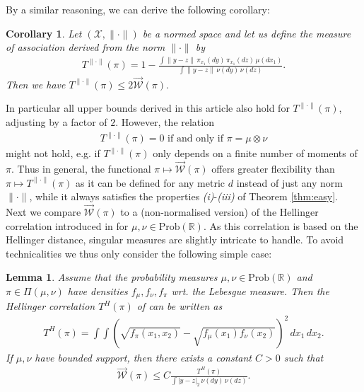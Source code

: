 \documentclass[10pt]{amsart}
\newtheorem{lemma}[theorem]{Lemma}
\newtheorem{corollary}[theorem]{Corollary}
\newcommand{\R}{\mathbb{R}}
\begin{document}
By a similar reasoning, we can derive the following corollary:
\begin{corollary}
Let $(\mathcal{X},\|\cdot\|)$ be a normed space and let us define the measure of association derived from the norm $\|\cdot\|$ by 
\begin{align*}
T^{\|\cdot\|}(\pi)= 1-\frac{\int \|y-z\| \,\pi_{x_1}(dy)\,\pi_{x_1}(dz)\,\mu(dx_1)}{\int \|y-z\| \,\nu(dy)\,\nu(dz)}.
\end{align*}
Then we have $T^{\|\cdot\|}(\pi)\le 2 \overrightarrow{\mathcal{W}}(\pi).$ 
\end{corollary}

In particular all upper bounds derived in this article also hold for $T^{\|\cdot\|}(\pi)$, adjusting by a factor of $2$. However, the relation 
\begin{align*}
T^{\|\cdot\|}(\pi)=0 \text{ if and only if } \pi=\mu\otimes\nu
\end{align*}
might not hold, e.g. if $T^{\|\cdot\|}(\pi)$ only depends on a finite number of moments of $\pi$. Thus in general, the functional $\pi\mapsto \overrightarrow{\mathcal{W}}(\pi)$ offers greater flexibility than $\pi\mapsto T^{\|\cdot\|}(\pi)$ as it can be defined for any metric $d$ instead of just any norm $\|\cdot\|$, while it always satisfies the properties \textit{(i)}-\textit{(iii)} of Theorem \ref{thm:easy}.\\

Next we compare $\overrightarrow{\mathcal{W}}(\pi)$ to a (non-normalised version) of the Hellinger correlation introduced in \cite{geenens2020hellinger} for $\mu,\nu\in \mathrm{Prob}(\R)$. As this correlation is based on the Hellinger distance, singular measures are slightly intricate to handle. To avoid technicalities we thus only consider the following simple case:

\begin{lemma}\label{lem:hell}
Assume that the probability measures $\mu,\nu\in \text{Prob}(\R)$ and $\pi\in \Pi(\mu,\nu)$ have densities $f_\mu, f_\nu, f_\pi$ wrt. the Lebesgue measure. Then the Hellinger correlation $T^H(\pi)$ of \cite[Section 4]{geenens2020hellinger} can be written as
\begin{align*}
T^H(\pi)=\int \int \left( \sqrt{ f_\pi(x_1, x_2)}-\sqrt{ f_\mu(x_1) f_\nu(x_2)} \right)^2\,dx_1\,dx_2.
\end{align*}
If $\mu,\nu$ have bounded support, then there exists a constant $C>0$ such that
\begin{align*}
\overrightarrow{\mathcal{W}}(\pi) \le C \frac{T^H(\pi)}{\int |y-z|_2\,\nu(dy)\,\nu(dz)} .
\end{align*}
\end{lemma}
\end{document}
